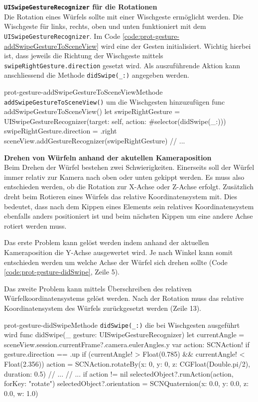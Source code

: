 \begin{description}
    \textbf{\texttt{UISwipeGestureRecognizer} für die Rotationen}\\
    Die Rotation eines Würfels sollte mit einer Wischgeste ermöglicht werden. Die Wischgeste für links, rechts, oben und unten funktioniert mit dem \texttt{UISwipeGestureRecognizer}. Im Code \ref{code:prot-gesture-addSwipeGestureToSceneView} wird eine der Gesten initialisiert. Wichtig hierbei ist, dass jeweils die Richtung der Wischgeste mittels \texttt{swipeRightGesture.direction} gesetzt wird. Als auszuführende Aktion kann anschliessend die Methode \texttt{didSwipe(\_:)} angegeben werden.

    \begin{code}{prot-gesture-addSwipeGestureToSceneView}{Methode \texttt{addSwipeGestureToSceneView()} um die Wischgesten hinzuzufügen}
        func addSwipeGestureToSceneView() {
            let swipeRightGesture = UISwipeGestureRecognizer(target: self, action: #selector(didSwipe(_:)))
            swipeRightGesture.direction = .right
            sceneView.addGestureRecognizer(swipeRightGesture)
            // ...
        }
    \end{code}

    \textbf{Drehen von Würfeln anhand der akutellen Kameraposition}\\
    Beim Drehen der Würfel bestehen zwei Schwierigkeiten. Einerseits soll der Würfel immer relativ zur Kamera nach oben oder unten gekippt werden. Es muss also entschieden werden, ob die Rotation zur X-Achse oder Z-Achse erfolgt. Zusätzlich dreht beim Rotieren eines Würfels das relative Koordinatensystem mit. Dies bedeutet, dass nach dem Kippen eines Elements sein relatives Koordinatensystem ebenfalls anders positioniert ist und beim nächsten Kippen um eine andere Achse rotiert werden muss. 

    Das erste Problem kann gelöst werden indem anhand der aktuellen Kameraposition die Y-Achse ausgewertet wird. Je nach Winkel kann somit entschieden werden um welche Achse der Würfel sich drehen sollte (Code \ref{code:prot-gesture-didSwipe}, Zeile 5).

    Das zweite Problem kann mittels Überschreiben des relativen Würfelkoordinatensystems gelöst werden. Nach der Rotation muss das relative Koordinatensystem des Würfels zurückgesetzt werden (Zeile 13).

    \begin{code}{prot-gesture-didSwipe}{Methode \texttt{didSwipe(\_:)} die bei Wischgesten ausgeführt wird}
    func didSwipe(_ gesture: UISwipeGestureRecognizer) {
        let currentAngle = sceneView.session.currentFrame?.camera.eulerAngles.y
        var action: SCNAction!
        if gesture.direction == .up {
            if (currentAngle! > Float(0.785) && currentAngle! < Float(2.356)) {
                action = SCNAction.rotateBy(x: 0, y: 0, z: CGFloat(Double.pi/2), duration: 0.5)
            }
            // ...
        }
        // ...
        if action != nil {
            selectedObject?.runAction(action, forKey: "rotate")
            selectedObject?.orientation = SCNQuaternion(x: 0.0, y: 0.0, z: 0.0, w: 1.0)
        }
    }
    \end{code} 

\end{description}    
